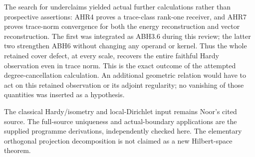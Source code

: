 The search for underclaims yielded actual further calculations rather
than prospective assertions: AHR4 proves a trace-class rank-one
receiver, and AHR7 proves trace-norm convergence for both the energy
reconstruction and vector reconstruction. The first was integrated as
ABH3.6 during this review; the latter two strengthen ABH6 without
changing any operand or kernel. Thus the whole retained cover defect, at
every scale, recovers the entire faithful Hardy observation even in
trace norm. This is the exact outcome of the attempted
degree-cancellation calculation. An additional geometric relation would
have to act on this retained observation or its adjoint regularity; no
vanishing of those quantities was inserted as a hypothesis.

The classical Hardy/isometry and local-Dirichlet input remains Noor's
cited source. The full-source uniqueness and actual-boundary
applications are the supplied programme derivations, independently
checked here. The elementary orthogonal projection decomposition is not
claimed as a new Hilbert-space theorem.
